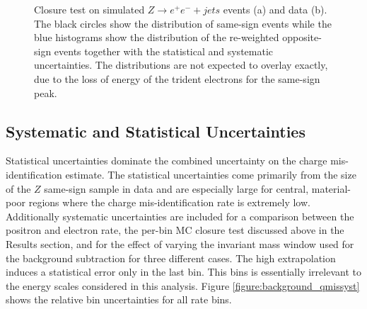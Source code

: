 \begin{figure}[htb!]
\begin{minipage}[h]{0.5\textwidth}
\end{minipage}\hfill
  \caption{Closure test on simulated $Z\rightarrow e^+e^-+jets$ events (a)   and data (b). 
      The black circles show the distribution of same-sign events while the blue histograms
      show the distribution of the re-weighted opposite-sign events together with the statistical and systematic uncertainties. The distributions are not
    expected to overlay exactly, due to the loss of energy of the trident electrons for the
    same-sign peak. \label{figure:background_clMll}}
\end{figure}


\subsection{Systematic and Statistical Uncertainties}

Statistical uncertainties dominate the combined uncertainty on the charge mis-identification estimate. The statistical uncertainties come primarily from the size of the $Z$ same-sign sample in data and are especially large for central, material-poor regions where the charge mis-identification rate is extremely low. Additionally systematic uncertainties are included for a comparison between the positron and electron rate, the per-bin MC closure test discussed above in the Results section, and for the effect of varying the invariant mass window used for the background subtraction for three different cases. The high \pt extrapolation induces a statistical error only in the last \pt bin. This bins is essentially irrelevant to the energy scales considered in this analysis. Figure \ref{figure:background_qmissyst} shows the relative bin uncertainties for all rate bins.



